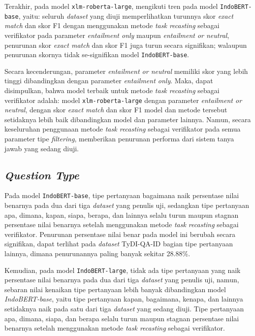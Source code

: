 Terakhir, pada model \texttt{xlm-roberta-large}, mengikuti tren pada model \texttt{IndoBERT-base}, yaitu: seluruh \emph{dataset} yang diuji memperlihatkan turunnya skor \emph{exact match} dan skor F1 dengan menggunakan metode \emph{task recasting} sebagai verifikator pada parameter \emph{entailment only} maupun \emph{entailment or neutral}, penurunan skor \emph{exact match} dan skor F1 juga turun secara signifikan; walaupun penurunan skornya tidak se-signifikan model \texttt{IndoBERT-base}.

Secara kecenderungan, parameter \emph{entailment or neutral} memiliki skor yang lebih tinggi dibandingkan dengan parameter \emph{entailment only}. Maka, dapat disimpulkan, bahwa model terbaik untuk metode \emph{task recasting} sebagai verifikator adalah: model \texttt{xlm-roberta-large} dengan parameter \emph{entailment or neutral}, dengan skor \emph{exact match} dan skor F1 model dan metode tersebut setidaknya lebih baik dibandingkan model dan parameter lainnya. Namun, secara keseluruhan penggunaan metode \emph{task recasting} sebagai verifikator pada semua parameter tipe \emph{filtering}, memberikan penurunan performa dari sistem tanya jawab yang sedang diuji.

\subsection{\emph{Question Type}}
Pada model \texttt{IndoBERT-base}, tipe pertanyaan bagaimana naik persentase nilai benarnya pada dua dari tiga \emph{dataset} yang penulis uji, sedangkan tipe pertanyaan apa, dimana, kapan, siapa, berapa, dan lainnya selalu turun maupun stagnan persentase nilai benarnya setelah menggunakan metode \emph{task recasting} sebagai verifikator. Penurunan persentase nilai benar pada model ini berubah secara signifikan, dapat terlihat pada \emph{dataset} TyDI-QA-ID bagian tipe pertanyaan lainnya, dimana penurunannya paling banyak sekitar 28.88\%.

Kemudian, pada model \texttt{IndoBERT-large}, tidak ada tipe pertanyaan yang naik persentase nilai benarnya pada dua dari tiga \emph{dataset} yang penulis uji, namun, sebaran nilai kenaikan tipe pertanyaan lebih banyak dibandingkan model \emph{IndoBERT-base}, yaitu tipe pertanyaan kapan, bagaimana, kenapa, dan lainnya setidaknya naik pada satu dari tiga \emph{dataset} yang sedang diuji. Tipe pertanyaan apa, dimana, siapa, dan berapa selalu turun maupun stagnan persentase nilai benarnya setelah menggunakan metode \emph{task recasting} sebagai verifikator.

